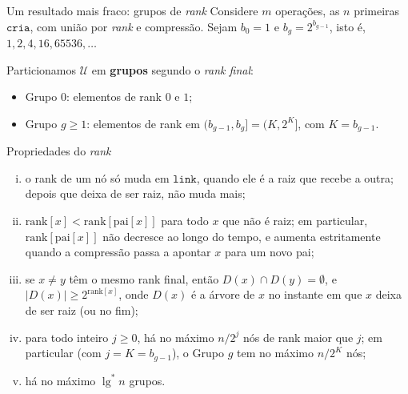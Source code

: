 \documentclass[aspectratio=169,10pt]{beamer}
\newcommand{\Cria}{\mathtt{cria}}
\newcommand{\Link}{\mathtt{link}}
\renewcommand{\lg}{\operatorname{lg}}
\newcommand{\lgs}{\lg^{*}}
\begin{document}
\begin{frame}[t]{Um resultado mais fraco: grupos de \textit{rank}}
  \small
  Considere $m$ operações, as $n$ primeiras $\Cria$, com união por
  \textit{rank} e compressão.  Sejam $b_0=1$ e $b_g=2^{b_{g-1}}$, isto
  é, $1,2,4,16,65536,\dots$

  Particionamos $\mathcal U$ em \textbf{grupos} segundo o \textit{rank
    final}:
  \begin{itemize}
  \item Grupo $0$: elementos de rank $0$ e $1$;
  \item Grupo $g\geq1$: elementos de rank em $(b_{g-1},b_g]=(K,2^K]$,
    com $K=b_{g-1}$.
  \end{itemize}
  \begin{block}{Propriedades do \textit{rank}}
    \begin{enumerate}[(i)]
    \item o rank de um nó só muda em $\Link$, quando ele é a raiz que
      recebe a outra; depois que deixa de ser raiz, não muda mais;
    \item $\mathrm{rank}[x]<\mathrm{rank}[\mathrm{pai}[x]]$ para todo
      $x$ que não é raiz; em particular, $\mathrm{rank}[\mathrm{pai}[x]]$
      não decresce ao longo do tempo, e aumenta estritamente quando a
      compressão passa a apontar $x$ para um novo pai;
    \item se $x\neq y$ têm o mesmo rank final, então
      $D(x)\cap D(y)=\emptyset$, e $|D(x)|\geq2^{\mathrm{rank}[x]}$,
      onde $D(x)$ é a árvore de $x$ no instante em que $x$ deixa de ser
      raiz (ou no fim);
    \item para todo inteiro $j\geq0$, há no máximo $n/2^j$ nós de rank
      maior que $j$; em particular (com $j=K=b_{g-1}$), o Grupo $g$ tem
      no máximo $n/2^K$ nós;
    \item há no máximo $\lgs n$ grupos.
    \end{enumerate}
  \end{block}
\end{frame}
\end{document}
